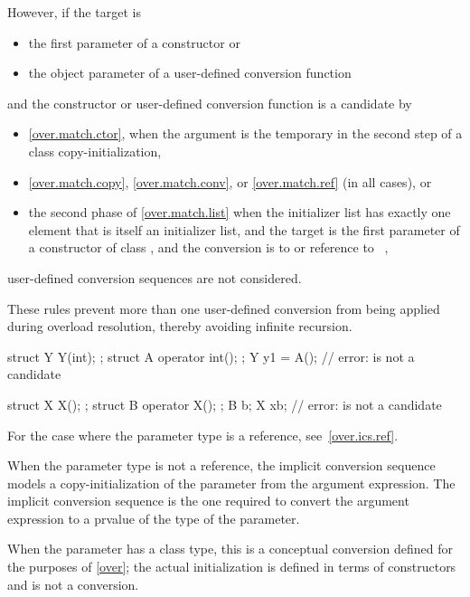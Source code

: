 \pnum
However, if the target is
\begin{itemize}
\item the first parameter of a constructor or
\item the object parameter of a user-defined conversion function
\end{itemize}
and the constructor or user-defined conversion function is a candidate by
\begin{itemize}
\item \ref{over.match.ctor}, when the argument is the temporary in the second
step of a class copy-initialization,
\item \ref{over.match.copy}, \ref{over.match.conv}, or \ref{over.match.ref}
(in all cases), or
\item the second phase of \ref{over.match.list}
when the initializer list has exactly one element that
is itself an initializer list, and
the target is the first parameter of a constructor of class , and
the conversion is to  or reference to \cv{}~,
\end{itemize}
user-defined conversion sequences are not considered.
\begin{note}
These rules prevent more than one user-defined conversion from being
applied during overload resolution, thereby avoiding infinite recursion.
\end{note}
\begin{example}
\begin{codeblock}
struct Y { Y(int); };
struct A { operator int(); };
Y y1 = A();         // error:  is not a candidate

struct X { X(); };
struct B { operator X(); };
B b;
X x{{b}};           // error:  is not a candidate
\end{codeblock}
\end{example}

\pnum
For the case where the parameter type is a reference, see~\ref{over.ics.ref}.

\pnum
When the parameter type is not a reference, the implicit conversion
sequence models a copy-initialization of the parameter from the argument
expression.
The implicit conversion sequence is the one required to convert the
argument expression to a prvalue of the type of
the parameter.
\begin{note}
When the parameter has a class type, this is a conceptual conversion
defined for the purposes of \ref{over}; the actual initialization is
defined in terms of constructors and is not a conversion.
\end{note}


